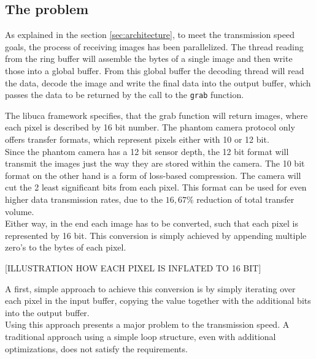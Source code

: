 \subsection{The problem}

As explained in the section \ref{sec:architecture}, to meet the transmission speed goals, the process of receiving images has been parallelized. The thread reading from the ring buffer will assemble the bytes of a single image and then write those into a global buffer. From this global buffer the decoding thread will read the data, decode the image and write the final data into the output buffer, which passes the data to be returned by the call to the \texttt{grab} function.\par 

The libuca framework specifies, that the grab function will return images, where each pixel is described by 16 bit number. The phantom camera protocol only offers transfer formats, which represent pixels either with 10 or 12 bit.\\
Since the phantom camera has a 12 bit sensor depth, the 12 bit format will transmit the images just the way they are stored within the camera. The 10 bit format on the other hand is a form of loss-based compression. The camera will cut the 2 least significant bits from each pixel. This format can be used for even higher data transmission rates, due to the $16,67\%$ reduction of total transfer volume.\\
Either way, in the end each image has to be converted, such that each pixel is represented by 16 bit. This conversion is simply achieved by appending multiple zero's to the bytes of each pixel.

[ILLUSTRATION HOW EACH PIXEL IS INFLATED TO 16 BIT]

A first, simple approach to achieve this conversion is by simply iterating over each pixel in the input buffer, copying the value together with the additional bits into the output buffer.\\
Using this approach presents a major problem to the transmission speed. A traditional approach using a simple loop structure, even with additional optimizations, does not satisfy the requirements.

